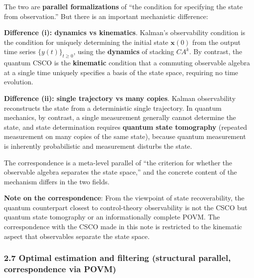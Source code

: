 \documentclass[
]{article}
\begin{document}
The two are \textbf{parallel formalizations} of ``the condition for
specifying the state from observation.'' But there is an important
mechanistic difference:

\textbf{Difference (i): dynamics vs kinematics}. Kalman's observability
condition is the condition for uniquely determining the initial state
\(\mathbf{x}(0)\) from the output time series \(\{y(t)\}_{t\geq0}\),
using the \textbf{dynamics} of stacking \(CA^k\). By contrast, the
quantum CSCO is the \textbf{kinematic} condition that a commuting
observable algebra at a single time uniquely specifies a basis of the
state space, requiring no time evolution.

\textbf{Difference (ii): single trajectory vs many copies}. Kalman
observability reconstructs the state from a deterministic single
trajectory. In quantum mechanics, by contrast, a single measurement
generally cannot determine the state, and state determination requires
\textbf{quantum state tomography} (repeated measurement on many copies
of the same state), because quantum measurement is inherently
probabilistic and measurement disturbs the state.

The correspondence is a meta-level parallel of ``the criterion for
whether the observable algebra separates the state space,'' and the
concrete content of the mechanism differs in the two fields.

\textbf{Note on the correspondence}: From the viewpoint of state
recoverability, the quantum counterpart closest to control-theory
observability is not the CSCO but quantum state tomography or an
informationally complete POVM. The correspondence with the CSCO made in
this note is restricted to the kinematic aspect that observables
separate the state space.

\subsubsection{2.7 Optimal estimation and filtering (structural
parallel, correspondence via
POVM)}\label{optimal-estimation-and-filtering-structural-parallel-correspondence-via-povm}
\end{document}
